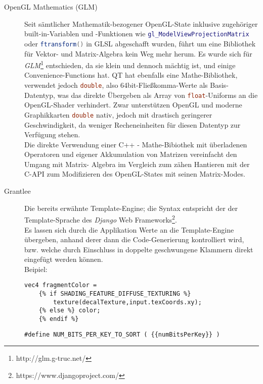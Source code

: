 \begin{description}
    	
    	\item[OpenGL Mathematics (GLM)]
    	Seit sämtlicher Mathematik-bezogener OpenGL-State inklusive zugehöriger built-in-Variablen und -Funktionen
    	wie \lstinline[language=GLSL]|gl_ModelViewProjectionMatrix| oder
    	\lstinline[language=GLSL]|ftransform()|
    	in GLSL abgeschafft wurden, führt um eine Bibliothek für Vektor- und Matrix-Algebra kein Weg mehr herum.
    	Es wurde sich für \emph{GLM}\footnote{http://glm.g-truc.net/} entschieden, da sie klein und dennoch mächtig ist,
    	und einige Convenience-Functions hat. QT hat ebenfalls eine Mathe-Bibliothek, verwendet jedoch
    	\lstinline[language=C]|double|, also 64bit-Fließkomma-Werte als Basis-Datentyp, was das direkte Übergeben
    	als Array von \lstinline[language=C]|float|-Uniforms an die OpenGL-Shader verhindert. Zwar unterstützen OpenGL
    	und moderne Graphikkarten \lstinline[language=C]|double| nativ, jedoch mit drastisch geringerer Geschwindigkeit,
    	da weniger Recheneinheiten für diesen Datentyp zur Verfügung stehen.\\
    	Die direkte Verwendung einer C++ - Mathe-Bibiothek mit überladenen Operatoren
    	und eigener Akkumulation von Matrizen vereinfacht den Umgang mit Matrix- Algebra
		im Vergleich zum zähen Hantieren mit der C-API zum Modifizieren des OpenGL-States mit seinen Matrix-Modes.
    	
    	\item[Grantlee]
    		\label{sec:archtitectured:dependencies:Grentlee}
	 		\lstset{language=GLSL} 
       		Die bereits erwähnte Template-Engine; die Syntax entspricht der der Template-Sprache des 
       		\emph{Django} Web Frameworks\footnote{https://www.djangoproject.com/}.\\

       		Es lassen sich durch die Applikation Werte an die Template-Engine übergeben, anhand derer
       		dann die Code-Generierung kontrolliert wird, bzw. welche durch Einschluss in doppelte
       		geschwungene Klammern direkt eingefügt werden können. \\
       		Beipiel:
			\begin{lstlisting}      		
vec4 fragmentColor =  	
	{% if SHADING_FEATURE_DIFFUSE_TEXTURING %}  
		texture(decalTexture,input.texCoords.xy);
	{% else %} color;
	{% endif %}  
			\end{lstlisting} 
			\begin{lstlisting}
#define NUM_BITS_PER_KEY_TO_SORT ( {{numBitsPerKey}} )
			\end{lstlisting} 
     		

\end{description}
